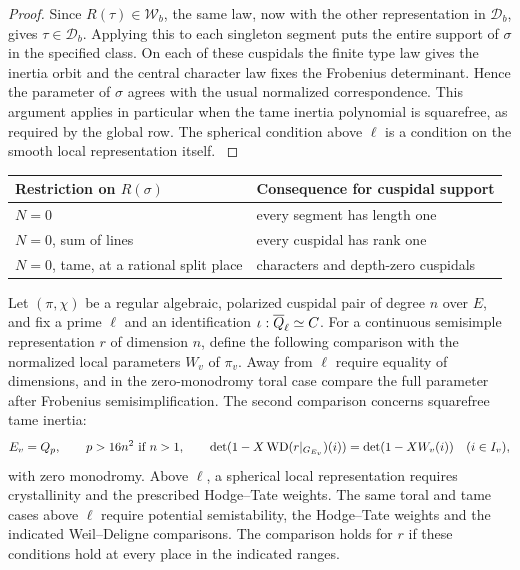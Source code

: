 \begin{proof}
Since \(R(\tau)\in\mathcal W_b\),
the same law, now with the other representation in
\(\mathcal D_b\), gives \(\tau\in\mathcal D_b\). Applying
this to each singleton segment puts the entire support of
\(\sigma\) in the specified class. On each of these cuspidals
the finite type law gives the inertia orbit and the central
character law fixes the Frobenius determinant. Hence the
parameter of \(\sigma\) agrees with the usual normalized
correspondence. This argument applies in particular when the
tame inertia polynomial is squarefree, as required by the
global row. The spherical condition above \(\ell\) is a
condition on the smooth local representation itself.
\hfill\mbox{\cite{adrian-roe}}\label{cor:cohomology-local-global-1}

\end{proof}

\begin{construction}
\begin{tabular}{@{}ll@{}}\toprule
Restriction on \(R(\sigma)\) & Consequence for cuspidal support\\\midrule
\(N=0\) & every segment has length one\\
\(N=0\), sum of lines & every cuspidal has rank one\\
\(N=0\), tame, at a rational split place &
characters and depth-zero cuspidals\\\bottomrule
\end{tabular}
\caption{The two local comparison ranges. The segment rule detects monodromy block sizes. For a tame irreducible factor the Frobenius orbit of its inertia character identifies its depth-zero type.}\label{fig:two-local-comparison-ranges}
\end{construction}

\begin{paramdefinition}\label{hyp:local-global-ranges}
Let \((\pi,\chi)\) be a regular algebraic, polarized cuspidal
pair of degree \(n\) over \(E\), and fix a prime \(\ell\) and
an identification \(\iota:\overline{Q}_\ell\simeq C\).
For a continuous semisimple representation
\(r\) of dimension \(n\), define the following comparison with the normalized local parameters \(W_v\) of \(\pi_v\). Away from \(\ell\) require equality of dimensions, and in
the zero-monodromy toral case compare the full parameter after
Frobenius semisimplification. The second comparison concerns
squarefree tame inertia:
\[
  E_v=Q_p,\qquad p>16n^2\ \text{if }n>1,
  \qquad
  \det(1-X\operatorname{WD}(r|_{G_{E_v}})(i))
     =\det(1-XW_v(i))\quad(i\in I_v),
\]
with zero monodromy. Above \(\ell\), a spherical local
representation requires crystallinity and the prescribed
Hodge--Tate weights. The same toral and tame cases above \(\ell\)
require potential semistability, the Hodge--Tate weights
and the indicated Weil--Deligne comparisons. The comparison holds for \(r\) if these conditions hold at every place in the indicated ranges.
\end{paramdefinition}

